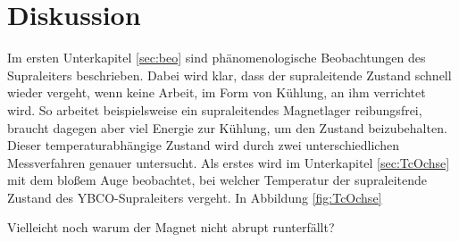 \section{Diskussion}
\label{sec:Diskussion}

Im ersten Unterkapitel \ref{sec:beo} sind phänomenologische Beobachtungen des Supraleiters
beschrieben. Dabei wird klar, dass der supraleitende Zustand schnell wieder vergeht,
wenn keine Arbeit, im Form von Kühlung, an ihm verrichtet wird. So arbeitet
beispielsweise ein supraleitendes Magnetlager reibungsfrei, braucht dagegen
aber viel Energie zur Kühlung, um den Zustand beizubehalten. Dieser temperaturabhängige
Zustand wird durch zwei unterschiedlichen Messverfahren genauer untersucht. Als
erstes wird im Unterkapitel \ref{sec:TcOchse} mit dem bloßem Auge beobachtet,
bei welcher Temperatur der supraleitende Zustand des YBCO-Supraleiters vergeht.
In Abbildung \ref{fig:TcOchse}

Vielleicht noch warum der Magnet nicht abrupt runterfällt?

